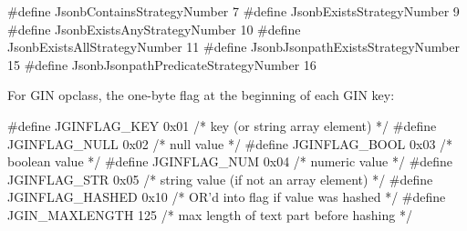 \begin{ccode}
#define JsonbContainsStrategyNumber   7
#define JsonbExistsStrategyNumber   9
#define JsonbExistsAnyStrategyNumber  10
#define JsonbExistsAllStrategyNumber  11
#define JsonbJsonpathExistsStrategyNumber   15
#define JsonbJsonpathPredicateStrategyNumber  16
\end{ccode}

For  GIN opclass, the one-byte flag at the beginning of
each GIN key:

\begin{ccode}
#define JGINFLAG_KEY    0x01    /* key (or string array element) */
#define JGINFLAG_NULL   0x02    /* null value */
#define JGINFLAG_BOOL   0x03    /* boolean value */
#define JGINFLAG_NUM    0x04    /* numeric value */
#define JGINFLAG_STR    0x05    /* string value (if not an array element) */
#define JGINFLAG_HASHED 0x10    /* OR'd into flag if value was hashed */
#define JGIN_MAXLENGTH  125     /* max length of text part before hashing */
\end{ccode}
